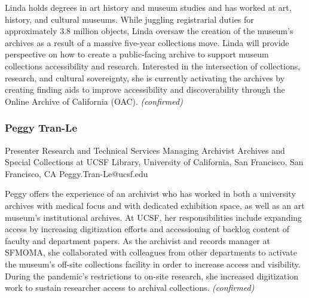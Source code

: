 \documentclass{report}
\begin{document}
                Linda holds degrees in art history and museum studies and has worked at art, history, and cultural museums. While juggling registrarial duties for approximately 3.8 million objects, Linda oversaw the creation of the museum’s archives as a result of a massive five-year collections move. Linda will provide perspective on how to create a public-facing archive to support museum collections accessibility and research. Interested in the intersection of collections, research, and cultural sovereignty, she is currently activating the archives by creating finding aids to improve accessibility and discoverability through the Online Archive of California (OAC).\newline
                \emph{ (confirmed) }
              

              
                \subsubsection*{ Peggy Tran-Le }
                Presenter\newline
                Research and Technical Services Managing Archivist\newline
                Archives and Special Collections at UCSF Library, University of California, San Francisco, San Francisco, CA
                \newline
                Peggy.Tran-Le@ucsf.edu\newline
                
                

                Peggy offers the experience of an archivist who has worked in both a university archives with medical focus and with dedicated exhibition space, as well as an art museum’s institutional archives.
At UCSF, her responsibilities include expanding access by increasing digitization efforts and accessioning of backlog content of faculty and department papers. 
As the archivist and records manager at SFMOMA, she collaborated with colleagues from other departments to activate the museum’s off-site collections facility in order to increase access and visibility. During the pandemic’s restrictions to on-site research, she increased digitization work to sustain researcher access to archival collections.
                \emph{ (confirmed) }
              

              

              
\end{document}
